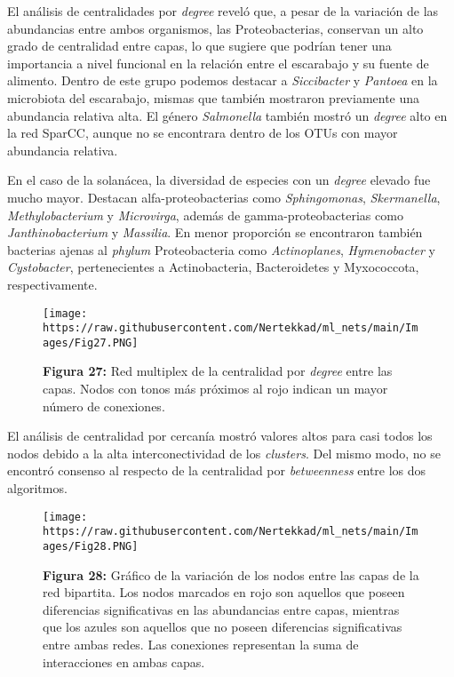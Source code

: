 \documentclass[
]{book}
\begin{document}
El análisis de centralidades por \emph{degree} reveló que, a pesar de la variación de las abundancias entre ambos organismos, las Proteobacterias, conservan un alto grado de centralidad entre capas, lo que sugiere que podrían tener una importancia a nivel funcional en la relación entre el escarabajo y su fuente de alimento. Dentro de este grupo podemos destacar a \emph{Siccibacter} y \emph{Pantoea} en la microbiota del escarabajo, mismas que también mostraron previamente una abundancia relativa alta. El género \emph{Salmonella} también mostró un \emph{degree} alto en la red SparCC, aunque no se encontrara dentro de los OTUs con mayor abundancia relativa.

En el caso de la solanácea, la diversidad de especies con un \emph{degree} elevado fue mucho mayor. Destacan alfa-proteobacterias como \emph{Sphingomonas}, \emph{Skermanella}, \emph{Methylobacterium} y \emph{Microvirga}, además de gamma-proteobacterias como \emph{Janthinobacterium} y \emph{Massilia}. En menor proporción se encontraron también bacterias ajenas al \emph{phylum} Proteobacteria como \emph{Actinoplanes}, \emph{Hymenobacter} y \emph{Cystobacter}, pertenecientes a Actinobacteria, Bacteroidetes y Myxococcota, respectivamente.

\begin{figure}
\centering
\texttt{[image: https://raw.githubusercontent.com/Nertekkad/ml\_nets/main/Images/Fig27.PNG]}
\caption{\textbf{Figura 27:} Red multiplex de la centralidad por \emph{degree} entre las capas. Nodos con tonos más próximos al rojo indican un mayor número de conexiones.}
\end{figure}

El análisis de centralidad por cercanía mostró valores altos para casi todos los nodos debido a la alta interconectividad de los \emph{clusters}. Del mismo modo, no se encontró consenso al respecto de la centralidad por \emph{betweenness} entre los dos algoritmos.

\begin{figure}
\centering
\texttt{[image: https://raw.githubusercontent.com/Nertekkad/ml\_nets/main/Images/Fig28.PNG]}
\caption{\textbf{Figura 28:} Gráfico de la variación de los nodos entre las capas de la red bipartita. Los nodos marcados en rojo son aquellos que poseen diferencias significativas en las abundancias entre capas, mientras que los azules son aquellos que no poseen diferencias significativas entre ambas redes. Las conexiones representan la suma de interacciones en ambas capas.}
\end{figure}
\end{document}
